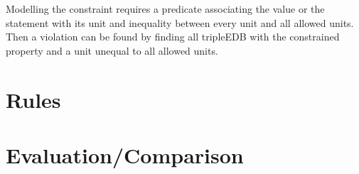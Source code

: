 \documentclass[hyperref,bachelorofscience]{cgvpub}
\begin{document}
Modelling the constraint requires a predicate associating the value or the statement with its unit and inequality between every unit and all allowed units. Then a violation can be found by finding all tripleEDB with the constrained property and a unit unequal to all allowed units.


\chapter{Rules}\label{cha_rules}
\chapter{Evaluation/Comparison}
\end{document}

